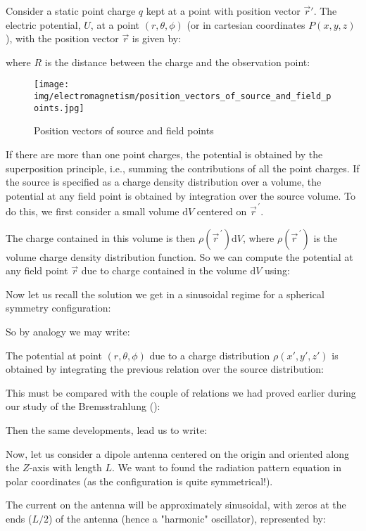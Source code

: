 	Consider a static point charge $q$ kept at a point with position vector $\vec{r}'$. The electric potential, $U$, at a point $(r, \theta, \phi)$ (or in cartesian coordinates $P(x,y,z)$), with the position vector $\vec{r}$ is given by:
	
	where $R$ is the distance between the charge and the observation point:

	
	\begin{figure}[H]
		\centering
		\texttt{[image: img/electromagnetism/position\_vectors\_of\_source\_and\_field\_points.jpg]}
		\caption[]{Position vectors of source and field points}
	\end{figure} 
	If there are more than one point charges, the potential is obtained by the superposition principle, i.e., summing the contributions of all the point charges. If the source is specified as a charge density distribution over a volume, the potential at any field point is obtained by integration over the source volume. To do this, we first consider a small volume $\mathrm{d}V$ centered on $\vec{r}^{\,'}$.
	
	The charge contained in this volume is then $\rho(\vec{r}^{\,'})\mathrm{d}V$, where $\rho(\vec{r}^{\,'})$ is the volume charge density distribution function. So we can compute the potential at any field point $\vec{r}$ due to charge contained in the volume $\mathrm{d}V$ using:
	
	Now let us recall the solution we get in a sinusoidal regime for a spherical symmetry configuration:
	
	So by analogy we may write:
	
	The potential at point $(r,\theta,\phi)$ due to a charge distribution $\rho(x',y',z')$ is obtained by integrating the previous relation over the source distribution:
	
	This must be compared with the couple of relations we had proved earlier during our study of the Bremsstrahlung ():
	
	Then the same developments, lead us to write:
	
	Now, let us consider a dipole antenna centered on the origin and oriented along the $Z$-axis with length $L$. We want to found the radiation pattern equation in polar coordinates (as the configuration is quite symmetrical!).
	
	The current on the antenna will be approximately sinusoidal, with zeros at the ends ($L/2$) of the antenna (hence a "harmonic" oscillator), represented by:
	
